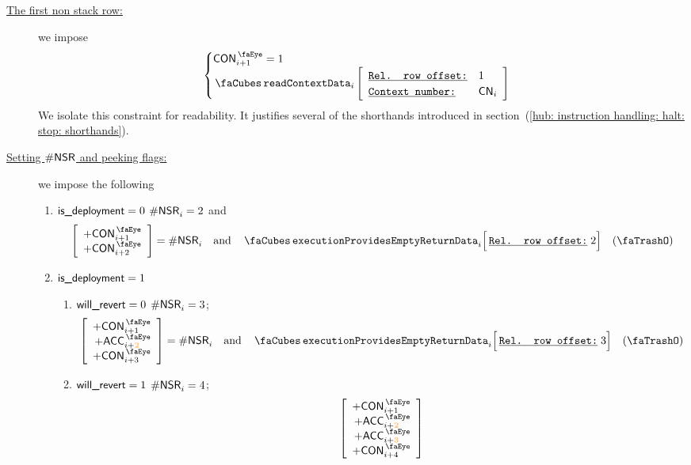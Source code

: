 \begin{description}
	\item[\underline{The first non stack row:}] we impose
		\[
			\begin{cases}
				\peekContext     _{i + 1} = 1    \\
				\readContextData {i}{1}{\cn_{i}} \\
			\end{cases}
		\]
		\saNote{} We isolate this constraint for readability. It justifies several of the shorthands introduced in section~(\ref{hub: instruction handling: halt: stop: shorthands}). 
	\item[\underline{Setting $\textsf{\#NSR}$ and peeking flags:}] we impose the following
		\begin{enumerate}
			\item \If $\textsf{is\_deployment} = 0$ \Then $\textsf{\#NSR}_{i} = 2$ and
				\[
					\left[ \begin{array}{r}
						+ \peekContext_{i + 1} \\
						+ \peekContext_{i + 2} \\
					\end{array} \right]
					= \nonStackRows_{i}
					\quad\text{and}\quad
					\executionProvidesEmptyReturnData {i}{2}  \quad(\trash)
				\]
			\item \If $\textsf{is\_deployment} = 1$ \Then 
				\begin{enumerate}
					\item \If $\textsf{will\_revert} = 0$ \Then $\textsf{\#NSR}_{i} = 3$;
						\[
							\left[ \begin{array}{r}
								+ \peekContext_{i + 1} \\
								+ \peekAccount_{i + \locFirstAccountRow} \\
								+ \peekContext_{i + 3} \\
							\end{array} \right]
							= \nonStackRows_{i}
							\quad\text{and}\quad
							\executionProvidesEmptyReturnData {i}{3}  \quad(\trash)
						\]
					\item \If $\textsf{will\_revert} = 1$ \Then $\textsf{\#NSR}_{i} = 4$;
						\[
							\left[ \begin{array}{r}
								+ \peekContext_{i + 1} \\
								+ \peekAccount_{i + \locFirstAccountRow} \\
								+ \peekAccount_{i + \locSecondAccountRow} \\
								+ \peekContext_{i + 4} \\
							\end{array} \right]
\]
\end{enumerate}
\end{enumerate}
\end{description}
